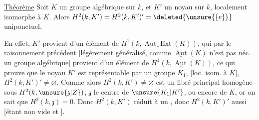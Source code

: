 \uline{Théorème}  Soit $K$ un groupe algébrique sur $k$, et $K'$ un noyau sur $k$, localement isomorphe à $K$. Alors $H^2(k,K')=H^2(k,K')'=\deleted{\unsure{\{e\}}}$ uniponctuel.

En effet, $K'$ provient d'un élément de $H^1(k,\underline{\operatorname{Aut}\operatorname{Ext}}(K))$, qui par le raisonnement précédent [\uline{légèrement généralisé}, comme $\underline{\operatorname{Aut}}(K)$ n'est pas néc. un groupe algébrique\unsure{\ldots}] provient d'un élément de $H^1(k,\underline{\operatorname{Aut}}(K))$, ce qui prouve que le noyau $K'$ est représentable par un groupe $K_1$, [loc. isom. à $K$],    $H^2(k,K')'\ne\varnothing$. Comme alors $H^2(k,K')\ne\varnothing$ est un fibré principal homogène sous $H^2(k,\unsure{\mathfrak{z}|Z})$, $\mathfrak{z}$ le centre de $\unsure{K_1|K'}$, ou encore de $K$, or on sait que $H^2(k,\mathfrak{z})=0$. Donc $H^2(k,K')$ réduit à un , donc $H^2(k,K')'$ aussi [étant non vide et ].

